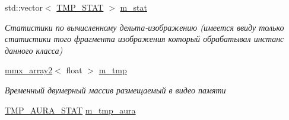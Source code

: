 \begin{DoxyCompactItemize}
\item 
std\+::vector$<$ \hyperlink{class_c_v_i_engine_thread_a963dcd94cfc9dd191a6c4dc50458797f}{T\+M\+P\+\_\+\+S\+T\+A\+T} $>$ \hyperlink{class_c_v_i_engine_thread_aa356e0ebc6490ee932679fb7ca5021b5}{m\+\_\+stat}
\begin{DoxyCompactList}\small\item\em Статистики по вычисленному дельта-\/изображению (имеется ввиду только статистики того фрагмента изображения который обрабатывал инстанс данного класса) \end{DoxyCompactList}\item 
\hyperlink{classmmx__array2}{mmx\+\_\+array2}$<$ float $>$ \hyperlink{class_c_v_i_engine_thread_af213b9d425f314412e3de05774960c3f}{m\+\_\+tmp}
\begin{DoxyCompactList}\small\item\em Временный двумерный массив размещаемый в видео памяти \end{DoxyCompactList}\item 
\hyperlink{struct_c_v_i_engine_thread_1_1tag_t_m_p___a_u_r_a___s_t_a_t}{T\+M\+P\+\_\+\+A\+U\+R\+A\+\_\+\+S\+T\+A\+T} \hyperlink{class_c_v_i_engine_thread_a6ffad2b9d46d3d237d194b7d07720f6b}{m\+\_\+tmp\+\_\+aura}
\end{DoxyCompactItemize}
